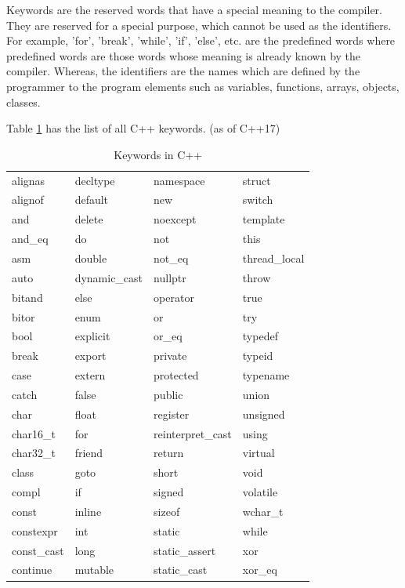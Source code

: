 \documentclass{book}
\begin{document}
Keywords are the reserved words that have a special meaning to the compiler. They are reserved for a special purpose, which cannot be used as the identifiers. For example, 'for', 'break', 'while', 'if', 'else', etc. are the predefined words where predefined words are those words whose meaning is already known by the compiler. Whereas, the identifiers are the names which are defined by the programmer to the program elements such as variables, functions, arrays, objects, classes.

Table \ref{keywords} has the list of all C++ keywords. (as of C++17)

\begin{table}[h]
\centering 
\begin{tabular}{llll} \hline 
alignas	& decltype	& namespace	& struct \\
alignof	& default	& new	& switch \\
and	& delete	& noexcept	& template \\
and\_eq	& do	& not	& this \\
asm	& double	& not\_eq	& thread\_local \\
auto	& dynamic\_cast &	nullptr	& throw \\
bitand	& else	& operator	& true \\
bitor	& enum	& or	& try \\
bool	& explicit	& or\_eq	& typedef \\
break	& export	& private	& typeid \\
case	& extern	& protected	& typename \\
catch	& false	& public	& union \\
char	& float	& register	& unsigned \\
char16\_t	& for	& reinterpret\_cast	& using \\
char32\_t	& friend	& return	& virtual \\
class	& goto	& short	& void \\
compl	& if	& signed	& volatile \\
const	& inline	& sizeof	& wchar\_t \\
constexpr	& int	& static	& while \\
const\_cast	& long	& static\_assert	& xor \\
continue	& mutable	& static\_cast	& xor\_eq \\ \hline 
\end{tabular}
\caption{Keywords in C++}
\label{keywords}
\end{table}
\end{document}
